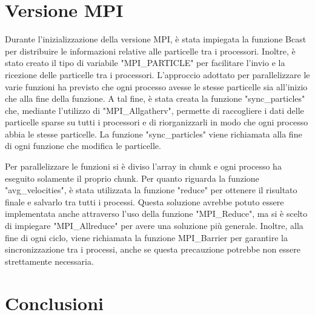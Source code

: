 \documentclass[a4paper,12pt, oneside]{article}
\begin{document}
\section{Versione MPI}

Durante l'inizializzazione della versione MPI, è stata impiegata la funzione Bcast per
distribuire le informazioni relative alle particelle tra i processori. Inoltre, è stato
creato il tipo di variabile "MPI\_PARTICLE" per facilitare l'invio e la ricezione delle
particelle tra i processori.
L'approccio adottato per parallelizzare le varie funzioni ha previsto che ogni processo
avesse le stesse particelle sia all'inizio che alla fine della funzione. A tal fine, è
stata creata la funzione "sync\_particles" che, mediante l'utilizzo di "MPI\_Allgatherv",
permette di raccogliere i dati delle particelle sparse su tutti i processori e di
riorganizzarli in modo che ogni processo abbia le stesse particelle. La funzione
"sync\_particles" viene richiamata alla fine di ogni funzione che modifica le particelle.

Per parallelizzare le funzioni si è diviso l'array in chunk e ogni processo ha eseguito
solamente il proprio chunk. Per quanto riguarda la funzione "avg\_velocities", è stata
utilizzata la funzione "reduce" per ottenere il risultato finale e salvarlo tra tutti i
processi. Questa soluzione avrebbe potuto essere implementata anche attraverso l'uso
della funzione "MPI\_Reduce", ma si è scelto di impiegare "MPI\_Allreduce" per avere 
una soluzione più generale.
Inoltre, alla fine di ogni ciclo, viene richiamata la funzione MPI\_Barrier per garantire
la sincronizzazione tra i processi, anche se questa precauzione potrebbe non essere
strettamente necessaria.

\section{Conclusioni}
\end{document}
